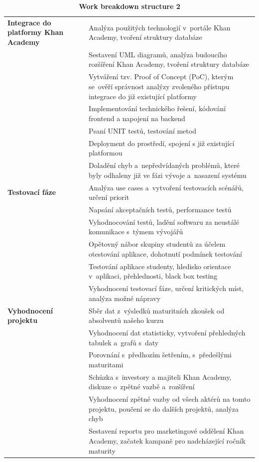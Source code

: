 \documentclass[12pt, a4paper]{report}
\begin{document}
\begin{table}[htbp]
\caption{\label{tab:org39c09d5}
\textbf{Work breakdown structure 2}}
\centering
\scriptsize
\begin{tabularx}{\textwidth}{|X|X|}
\hline
\textbf{Integrace do platformy Khan Academy} & Analýza použitých technologií v portále Khan Academy, tvoření struktury databáze\\
 & Sestavení UML diagramů, analýza budoucího rozšíření Khan Academy, tvoření struktury databáze\\
 & Vytváření tzv. Proof of Concept (PoC), kterým se ověří správnost analýzy zvoleného přístupu integrace do již existující platformy\\
 & Implementování technického řešení, kódování frontend a napojení na backend\\
 & Psaní UNIT testů, testování metod\\
 & Deployment do prostředí, spojení s již existující platformou\\
 & Doladění chyb a nepředvídaných problémů, které byly odhaleny již ve fázi vývoje a nasazení systému\\
\hline
\textbf{Testovací fáze} & Analýza use cases a vytvoření testovacích scénářů, určení priorit\\
 & Napsání akceptačních testů, performance testů\\
 & Vyhodnocování testů, ladění softwaru za neustálé komunikace s týmem vývojářů\\
 & Opětovný nábor skupiny studentů za účelem otestování aplikace, dohotnutí podmínek testování\\
 & Testování aplikace studenty, hledisko orientace v aplikaci, přehlednosti, black box testing\\
 & Vyhodnocení testovací fáze, určení kritických míst, analýza možné nápravy\\
\hline
\textbf{Vyhodnocení projektu} & Sběr dat z výsledků maturitních zkoušek od absolventů našeho kurzu\\
 & Vyhodnocení dat statisticky, vytvoření přehledných tabulek a grafů s daty\\
 & Porovnání s předhozím šetřením, s předešlými maturitami\\
 & Schůzka s investory a majiteli Khan Academy, diskuze o zpětné vazbě a rozšíření\\
 & Vyhodnocení zpětné vazby od všech aktérů na tomto projektu, poučení se do dalších projektů, analýza chyb\\
 & Sestavení reportu pro marketingové oddělení Khan Academy, začatek kampaně pro nadcházející ročník maturity\\
\hline
\end{tabularx}
\end{table}
\end{document}
